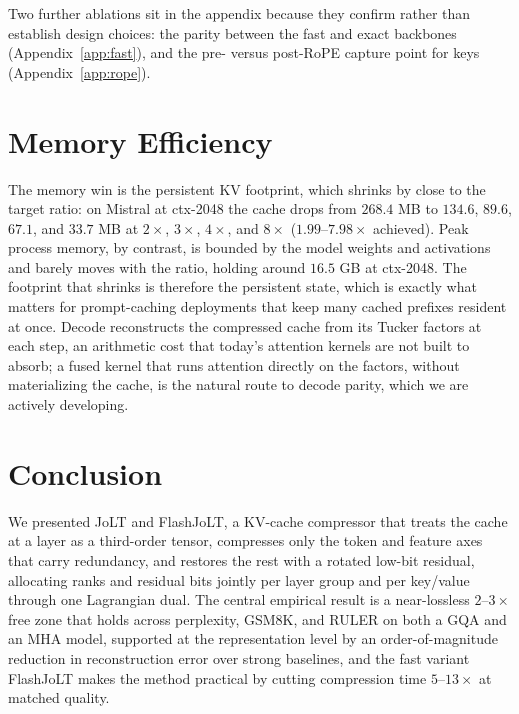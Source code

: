 \documentclass{article}
\begin{document}
Two further ablations sit in the appendix because they confirm rather than establish design choices: the parity between the fast and exact backbones (Appendix~\ref{app:fast}), and the pre- versus post-RoPE capture point for keys (Appendix~\ref{app:rope}).

\section{Memory Efficiency}
\label{sec:efficiency}
The memory win is the persistent KV footprint, which shrinks by close to the target ratio: on Mistral at ctx-2048 the cache drops from $268.4$ MB to $134.6$, $89.6$, $67.1$, and $33.7$ MB at $2\times$, $3\times$, $4\times$, and $8\times$ ($1.99$--$7.98\times$ achieved). Peak process memory, by contrast, is bounded by the model weights and activations and barely moves with the ratio, holding around $16.5$ GB at ctx-2048. The footprint that shrinks is therefore the persistent state, which is exactly what matters for prompt-caching deployments that keep many cached prefixes resident at once. Decode reconstructs the compressed cache from its Tucker factors at each step, an arithmetic cost that today's attention kernels are not built to absorb; a fused kernel that runs attention directly on the factors, without materializing the cache, is the natural route to decode parity, which we are actively developing.

\section{Conclusion}
\label{sec:conclusion}
We presented JoLT and FlashJoLT, a KV-cache compressor that treats the cache at a layer as a third-order tensor, compresses only the token and feature axes that carry redundancy, and restores the rest with a rotated low-bit residual, allocating ranks and residual bits jointly per layer group and per key/value through one Lagrangian dual. The central empirical result is a near-lossless $2$--$3\times$ free zone that holds across perplexity, GSM8K, and RULER on both a GQA and an MHA model, supported at the representation level by an order-of-magnitude reduction in reconstruction error over strong baselines, and the fast variant FlashJoLT makes the method practical by cutting compression time $5$--$13\times$ at matched quality.
\end{document}
